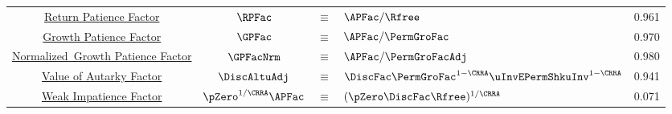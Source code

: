\begin{table}
{\begin{tabular}{|c|ccl|c|}
\href{https://\owner.github.io/BufferStockTheory\#RPFacDfn}{Return Patience Factor}                      & $\RPFac$ & $\equiv$ & $\APFac/\Rfree $     & 0.961 \\
\href{https://\owner.github.io/BufferStockTheory\#GPFacRawDfn}{\phantom{Normalized~}Growth Patience Factor}    & $\GPFac$ & $\equiv$ & $\APFac/\PermGroFac $      & 0.970 \\
\href{https://\owner.github.io/BufferStockTheory\#GPFacRawDfn}{Normalized~Growth Patience Factor}                      & $\GPFacNrm$ & $\equiv$ & $ \APFac/\PermGroFacAdj$& 0.980 \\
\href{https://\owner.github.io/BufferStockTheory\#VAFDfn}{Value of Autarky Factor}         & $\DiscAltuAdj $ & $\equiv$ & $ \DiscFac \PermGroFac^{1-\CRRA}\uInvEPermShkuInv^{1-\CRRA}$       & 0.941 \\
\href{https://\owner.github.io/BufferStockTheory\#WRICCond}{Weak Impatience Factor}         & $\pZero^{1/\CRRA} \APFac $ & $\equiv$ & $ (\pZero \DiscFac \Rfree)^{1/\CRRA}$       & 0.071 \\ \hline
\end{tabular}
} %
\settowidth\TableWidth{\usebox{\Calibration}}

\newlength{\CalibrationShrunk}
\newsavebox{\CalibrationShrunkBox}

\savebox{\CalibrationShrunkBox}{
  \settowidth{\CalibrationShrunk}{\usebox{\Calibration}}
  \resizebox{0.9\textwidth}{!}{\begin{minipage}{\CalibrationShrunk}
      \usebox{\Calibration}
    \end{minipage}}
}

\usebox{\CalibrationShrunkBox}

\end{table}
